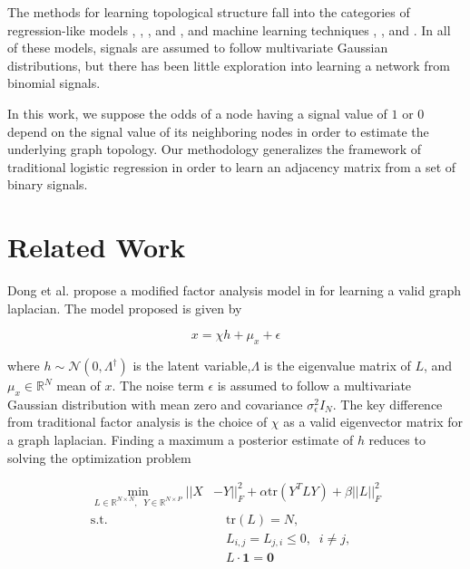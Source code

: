 \documentclass[journal]{IEEEtran}
\theoremstyle{definition}
\theoremstyle{remark}
\begin{document}
The methods for learning topological structure fall into the categories of regression-like models \cite{dong2016learning}, \cite{tugnait2021sparse}, \cite{pu2021learning}, and \cite{saboksayr2021accelerated}, and machine learning techniques \cite{pu2021kernel}, \cite{kalofolias2016learn}, and  \cite{venkitaraman2019predicting}. In all of these models, signals are assumed to follow multivariate Gaussian distributions, but there has been little exploration into learning a network from binomial signals. 

In this work, we suppose the odds of a node having a signal value of $1$ or $0$ depend on the signal value of its neighboring nodes in order to estimate the underlying graph topology. Our methodology generalizes the framework of traditional logistic regression in order to learn an adjacency matrix from a set of binary signals.

\section{Related Work}

Dong et al. propose a modified factor analysis model in \cite{dong2016learning} for learning a valid graph laplacian. The model proposed is given by 

$$
	x = \chi h + \mu_x + \epsilon
$$

where $h \sim \mathcal{N}(0, \Lambda^{\dagger})$ is the latent variable,$\Lambda$ is the eigenvalue matrix of $L$, and  $\mu_x \in \mathbb{R}^N$ mean of $x$. The noise term $\epsilon$ is assumed to follow a multivariate Gaussian distribution with mean zero and covariance $\sigma_\epsilon^2I_N$. The key difference from traditional factor analysis is the choice of $\chi$ as a valid eigenvector matrix for a graph laplacian. Finding a maximum a posterior estimate of $h$ reduces to solving the optimization problem

\begin{equation}
	\label{eq:dongmodel}
	\begin{aligned}
		\min_{L \in \mathbb{R}^{N\times N}, \phantom{..} Y \in \mathbb{R}^{N\times P}} ||X&-Y||_F^2 + \alpha \text{tr}(Y^TLY) + \beta||L||_F^2 \\
		\textrm{s.t.}& \quad \text{tr}(L) = N, \\
		&\quad L_{i,j} = L_{j,i} \leq 0, \phantom{..} i \neq j, \\
		&\quad L\cdot \textbf{1} = \textbf{0} \\
	\end{aligned}
\end{equation}
\end{document}
